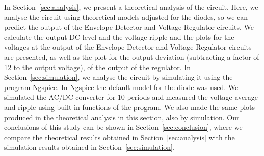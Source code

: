 In Section~\ref{sec:analysis}, we present a theoretical analysis of the circuit. Here, we analyse the circuit using theoretical models adjusted for the diodes, so we can predict the output of the Envelope Detector
and Voltage Regulator circuits. We calculate the output DC level and the
voltage ripple and the plots for the voltages at the output of the Envelope Detector and Voltage Regulator circuits are presented, as well as the plot for the output deviation (subtracting a factor of 12 to the output voltage), of the output of the regulator. 
In Section~\ref{sec:simulation}, we analyse the circuit by
simulating it using the program Ngspice. In Ngspice the default model for the diode was used. We simulated the AC/DC converter for 10 periods and measured the voltage average and ripple using built in functions of the program. We also made the same plots produced in the theoretical analysis in this section, also by simulation. Our conclusions of this study can be shown in
Section~\ref{sec:conclusion}, where we compare the theoretical results obtained in
Section~\ref{sec:analysis} with the simulation results obtained in
Section~\ref{sec:simulation}.





\pagebreak

